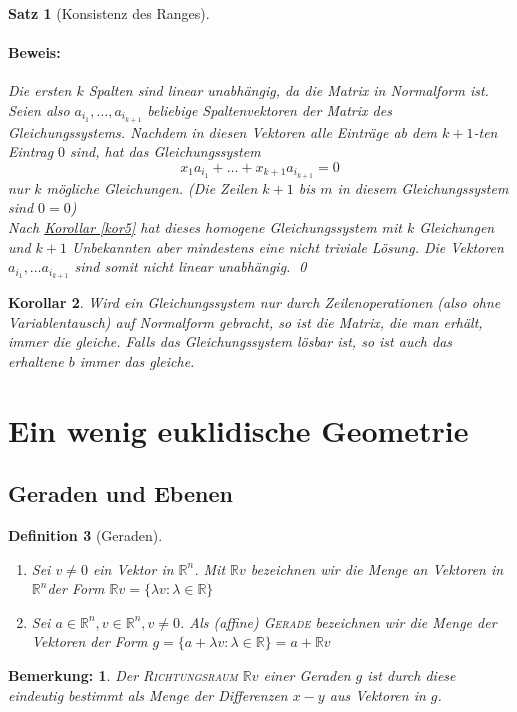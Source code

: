 \documentclass{report}
\newcommand{\IN}[1]{\index{#1|BH}}
\newcommand{\lb}{\lambda}
\newcommand{\R}{\mathbb{R}}
\newcommand{\Rn}{\mathbb{R}^n}
\newcommand{\mRn}{\(\mathbb{R}^n\)}
\theoremstyle{customrem}
\newtheorem*{bemerkung}{Bemerkung\textnormal:}
\theoremstyle{customdef}
\newtheorem{definition}{Definition}[chapter]
\newtheorem{korrolar}[definition]{Korollar}
\newtheorem{satz}[definition]{Satz}
\renewenvironment{proof}{\paragraph{Beweis: }}{\qed}
\theoremstyle{customenv}
\newcommand{\defemph}[1]{\textsc{#1}}
\begin{document}
\begin{satz}[Konsistenz des Ranges]
\begin{proof}
			Die ersten \(k\) Spalten sind linear unabhängig, da die Matrix in Normalform ist. Seien also \(a_{i_1}, \dots, a_{i_{k+1}}\) beliebige Spaltenvektoren der Matrix des Gleichungssystems. Nachdem in diesen Vektoren alle Einträge ab dem \(k+1\)-ten Eintrag \(0\) sind, hat das Gleichungssystem
			\[
			x_1a_{i_1} + \dots + x_{k+1}a_{i_{k+1}} = 0
			\]
			nur \(k\) mögliche Gleichungen. (Die Zeilen \(k+1\) bis \(m\) in diesem Gleichungssystem sind \(0=0\))\\
			Nach \hyperref[kor5]{Korollar \ref*{kor5}} hat dieses homogene Gleichungssystem mit \(k\) Gleichungen und \(k+1\) Unbekannten aber mindestens eine nicht triviale Lösung. Die Vektoren \(a_{i_1}, \dots a_{i_{k+1}}\) sind somit nicht linear unabhängig.
		\end{proof}
	\end{satz}
	\vspace{.2cm}
	\begin{korrolar}
		Wird ein Gleichungssystem \textit{nur} durch Zeilenoperationen (also ohne Variablentausch) auf Normalform gebracht, so ist die Matrix, die man erhält, immer die gleiche. Falls das Gleichungssystem lösbar ist, so ist auch das erhaltene \(b\) immer das gleiche.
	\end{korrolar}

	\section{Ein wenig euklidische Geometrie}

	\subsection{Geraden und Ebenen}

	\begin{definition}[Geraden]
		\IN{Gerade}
		\( \)\vspace{-.5cm}
		\begin{enumerate}
			\item Sei \(v \not= 0\) ein Vektor in \mRn. Mit \(\R v\) bezeichnen wir die Menge an Vektoren in \mRn der Form \(\R v = \{\lb v : \lb \in \R\}\)
			\item Sei \(a \in \Rn, v \in \Rn, v \neq 0\). Als (affine) \defemph{Gerade} bezeichnen wir die Menge der Vektoren der Form \(g = \{a + \lb v : \lb \in \R\} = a + \R v\)
		\end{enumerate}
	\end{definition}

	\begin{bemerkung}
		Der \defemph{Richtungsraum} \(\R v\) einer Geraden \(g\) ist durch diese eindeutig bestimmt als Menge der Differenzen \(x - y\) aus Vektoren in \(g\).
	\end{bemerkung}
\end{document}
